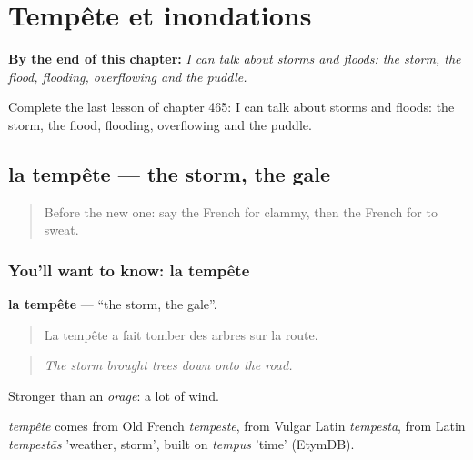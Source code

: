 
\chapter{Tempête et inondations}
\label{ch:fr-tempete-et-inondations}

\begin{chapteropening}
\textbf{By the end of this chapter:} \emph{I can talk about storms and floods: the storm, the flood, flooding, overflowing and the puddle.}

Complete the last lesson of chapter 465: I can talk about storms and floods: the storm, the flood, flooding, overflowing and the puddle.
\end{chapteropening}

\section[la tempête]{la tempête — the storm, the gale}

\label{lesson:FR-C465-tempete}



\begin{quote}
Before the new one: say the French for clammy, then the French for to sweat.
\end{quote}

\subsection*{You'll want to know: la tempête}
\textbf{la tempête} — \textquotedblleft{}the storm, the gale\textquotedblright{}.

\begin{quote}
La tempête a fait tomber des arbres sur la route.
\end{quote}

\begin{quote}
\emph{The storm brought trees down onto the road.}
\end{quote}

Stronger than an \emph{orage}: a lot of wind.

\begin{cousinweb}
\emph{tempête} comes from Old French \emph{tempeste}, from Vulgar Latin \emph{tempesta}, from Latin \emph{tempestās} 'weather, storm', built on \emph{tempus} 'time' (EtymDB).
\end{cousinweb}


